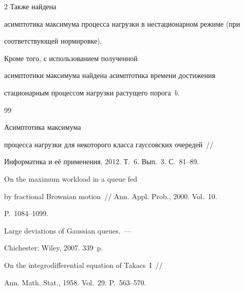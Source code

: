 \begin{multicols}{2}
Также найдена


асимптотика максимума процесса нагрузки в нестационарном режиме (при


соответствующей нормировке). 


Кроме того, с использованием полученной


асимптотики максимума  найдена асимптотика  времени достижения


стационарным процессом нагрузки растущего   порога~$b$.





{\small\frenchspacing


{%




\begin{thebibliography}{99}







 Асимптотика максимума


процесса нагрузки для некоторого класса гауссовских очередей~//


Информатика и её применения, 2012. Т.~6. Вып.~3. С.~81--89.







 On the maximum workload in a queue fed


by fractional Brownian motion~// Ann. Appl. Prob., 2000. Vol.~10.


P.~1084--1099.







 Large deviations of Gaussian queues.~---


Chichester: Wiley, 2007. 339~p.













 On the integrodifferential equation of Takacs~I~// 


Ann. Math. Stat., 1958. Vol.~29. P.~563--570.






\end{thebibliography}}}
\end{multicols}
